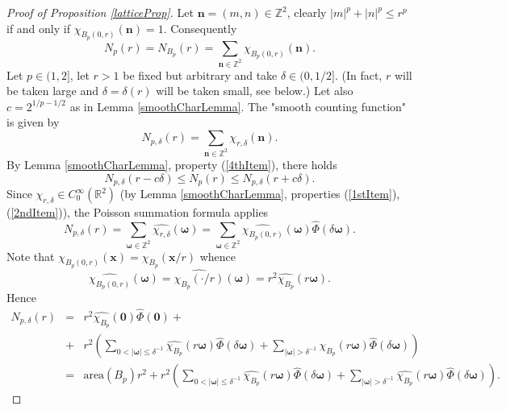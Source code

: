 \documentclass{amsart}
\numberwithin{equation}{section}
\begin{document}
\begin{proof}[Proof of Proposition \ref{latticeProp}]
Let $\boldsymbol{n}=(m,n)\in\mathbb{Z}^2$, clearly
$|m|^p+|n|^p\le r^p$ if and only if $\chi_{B_p(0,r)}(\boldsymbol{n})=1$.
Consequently 
$$
N_p(r)=N_{B_p}(r)=\sum_{\boldsymbol{n}\in \mathbb{Z}^2}\chi_{B_p(0,r)}(\boldsymbol{n}).
$$
Let $p\in(1,2]$, let $r>1$ be fixed but arbitrary and take $\delta\in(0,1/2]$. (In fact, $r$ will be taken large and $\delta=\delta(r)$ will be taken small, see below.) Let also $c=2^{1/p-1/2}$ as in Lemma \ref{smoothCharLemma}. The "smooth counting function" is given by
\begin{equation}
    \nonumber
    N_{p,\delta}(r)=\sum_{\boldsymbol{n}\in\mathbb{Z}^2}\chi_{r,\delta}(\boldsymbol{n}).
\end{equation}
By Lemma \ref{smoothCharLemma}, property (\ref{4thItem}), there holds
\begin{equation}
    \label{lattice-Est2}
    N_{p,\delta}(r-c\delta)\le N_p(r)\le N_{p,\delta}(r+c\delta).
\end{equation}
Since $\chi_{r,\delta}\in C_0^\infty(\mathbb{R}^2)$ (by Lemma \ref{smoothCharLemma}, properties (\ref{1stItem}), (\ref{2ndItem})),  the Poisson summation formula applies
\begin{equation}
    \nonumber
    N_{p,\delta}(r)=\sum_{\boldsymbol{\omega}\in\mathbb{Z}^2}\widehat{\chi_{r,\delta}}(\boldsymbol{\omega})=\sum_{\boldsymbol{\omega}\in\mathbb{Z}^2}\widehat{\chi_{B_p(0,r)}}(\boldsymbol{\omega})\widehat{\Phi}(\delta\boldsymbol{\omega}).
\end{equation}
Note that $\chi_{B_p(0,r)}(\boldsymbol{x})=\chi_{B_p}(\boldsymbol{x}/r)$ whence
$$
\widehat{\chi_{B_p(0,r)}}(\boldsymbol{\omega})=\widehat{\chi_{B_p}(\cdot/r)}(\boldsymbol{\omega})=r^2\widehat{\chi_{B_p}}(r\boldsymbol{\omega}).
$$
Hence
\begin{eqnarray}
    \nonumber
    N_{p,\delta}(r)&=&
    r^2\widehat{\chi_{B_p}}(\boldsymbol{0})\widehat{\Phi}(\boldsymbol{0})+\\
    \nonumber&+&r^2\left(\sum_{0<|\boldsymbol{\omega}|\le\delta^{-1}}\widehat{\chi_{B_p}}(r\boldsymbol{\omega})\widehat{\Phi}(\delta\boldsymbol{\omega})+\sum_{|\boldsymbol{\omega}|>\delta^{-1}}\widehat{\chi_{B_p}}(r\boldsymbol{\omega})\widehat{\Phi}(\delta\boldsymbol{\omega})\right)\\
    \nonumber
    &=&\text{area}(B_p)r^2+r^2\left(\sum_{0<|\boldsymbol{\omega}|\le\delta^{-1}}\widehat{\chi_{B_p}}(r\boldsymbol{\omega})\widehat{\Phi}(\delta\boldsymbol{\omega})+\sum_{|\boldsymbol{\omega}|>\delta^{-1}}\widehat{\chi_{B_p}}(r\boldsymbol{\omega})\widehat{\Phi}(\delta\boldsymbol{\omega})\right).

\end{eqnarray}
\end{proof}
\end{document}
